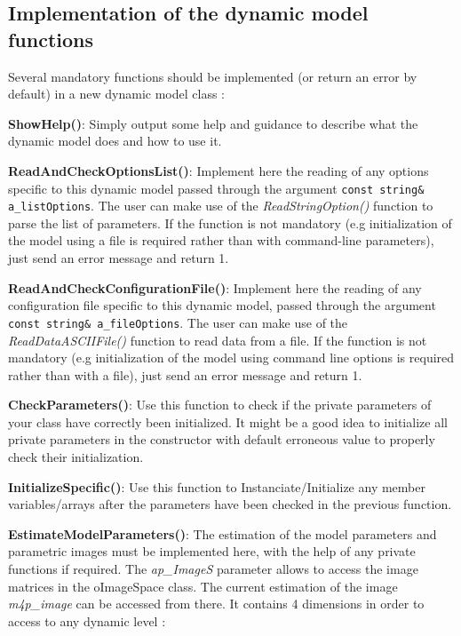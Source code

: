 \documentclass[a4paper, 11pt]{article}
\begin{document}
\subsection{Implementation of the dynamic model functions}

Several mandatory functions should be implemented (or return an error by default) in a new dynamic model class :

\begin{description}
\item \textbf{ShowHelp()}: Simply output some help and guidance to describe what the dynamic model does and how to use it.
\item \textbf{ReadAndCheckOptionsList()}: Implement here the reading of any options specific to this dynamic model passed through the argument \texttt{const string\& a\_listOptions}. The user can make use of the \textit{ReadStringOption()} function to parse the list of parameters. If the function is not mandatory (e.g initialization of the model using a file is required rather than with command-line parameters), just send an error message and return 1.
\item \textbf{ReadAndCheckConfigurationFile()}: Implement here the reading of any configuration file specific to this dynamic model, passed through the argument \texttt{const string\& a\_fileOptions}. The user can make use of the \textit{ReadDataASCIIFile()} function to read data from a file. If the function is not mandatory (e.g initialization of the model using command line options is required rather than with a file), just send an error message and return 1.
\item \textbf{CheckParameters()}: Use this function to check if the private parameters of your class have correctly been initialized. It might be a good idea to initialize all private parameters in the constructor with default erroneous value to properly check their initialization.
\item \textbf{InitializeSpecific()}: Use this function to Instanciate/Initialize any member variables/arrays after the parameters have been checked in the previous function.
  
\item \textbf{EstimateModelParameters()}: The estimation of the model parameters and parametric images must be implemented here, with the help of any private functions if required. The \textit{ap\_ImageS} parameter allows to access the image matrices in the oImageSpace class. The current estimation of the image \textit{m4p\_image} can be accessed from there. It contains 4 dimensions in order to access to any dynamic level : 


\end{description}
\end{document}

